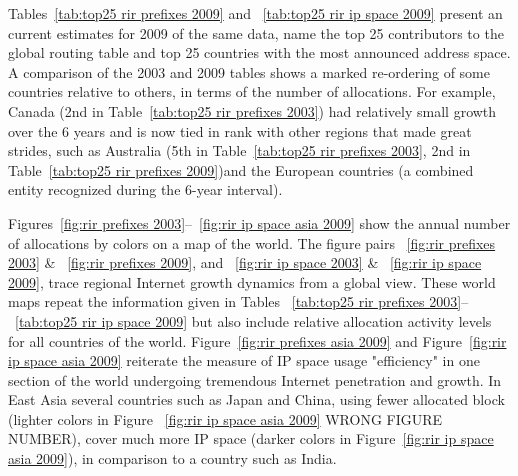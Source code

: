 Tables~\ref{tab:top25 rir prefixes 2009} and ~\ref{tab:top25 rir ip space
2009} present an current estimates for 2009 of the same data, name the top 25 contributors to the global
routing table and top 25 countries with the most announced address space. A comparison of the 2003 and 2009 tables shows a marked re-ordering of some
countries relative to others, in terms of the number of allocations. For example, Canada (2nd in Table~\ref{tab:top25 rir prefixes 2003}) had relatively small growth over the 6 years and is now tied in rank with other regions that made great strides, such as Australia (5th in Table~\ref{tab:top25 rir prefixes 2003}, 2nd in Table~\ref{tab:top25 rir prefixes 2009})and the European countries (a combined entity recognized during the 6-year interval).

Figures~\ref{fig:rir prefixes 2003}--~\ref{fig:rir ip space asia 2009} show the
annual number of allocations by colors on a map of the world. The figure pairs ~\ref{fig:rir prefixes 2003} & ~\ref{fig:rir prefixes 2009}, and ~\ref{fig:rir ip space 2003} & ~\ref{fig:rir ip space 2009},
trace regional Internet growth dynamics from a global view.  These world maps repeat the information given in Tables ~\ref{tab:top25 rir prefixes 2003}--~\ref{tab:top25 rir ip space
2009} but also include relative allocation activity levels for all countries of the world.  Figure~\ref{fig:rir
prefixes asia 2009} and Figure~\ref{fig:rir ip space asia 2009} reiterate the measure of IP space usage "efficiency" in one section of the world undergoing tremendous Internet penetration and growth.  In East Asia several countries such as Japan and China, using fewer allocated block (lighter colors in Figure ~\ref{fig:rir ip space asia 2009} WRONG FIGURE NUMBER), cover much more IP space (darker colors in Figure~\ref{fig:rir ip space asia 2009}), in comparison to a country such as India.




